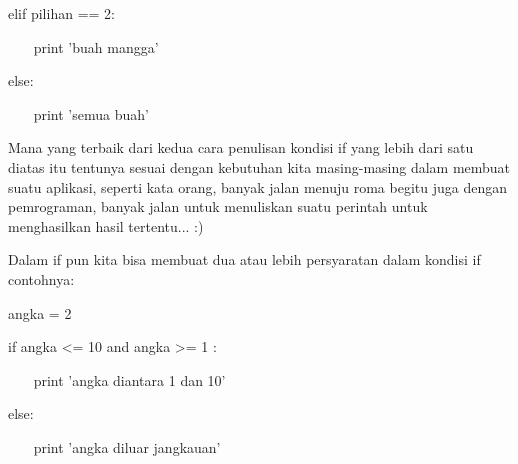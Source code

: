 \noindent 
elif pilihan == 2: \par
\vspace{12pt}
\noindent 
~~~ print 'buah mangga' \par
\vspace{12pt}
\noindent 
else: \par
\vspace{12pt}
\noindent 
~~~ print 'semua buah' \par
\vspace{12pt}
\noindent 
Mana yang terbaik dari kedua cara penulisan kondisi if yang lebih dari satu diatas itu tentunya sesuai dengan kebutuhan kita masing-masing dalam membuat suatu aplikasi, seperti kata orang, banyak jalan menuju roma begitu juga dengan pemrograman, banyak jalan untuk menuliskan suatu perintah untuk menghasilkan hasil tertentu... :) \par
\vspace{12pt}
\noindent 
Dalam if pun kita bisa membuat dua atau lebih persyaratan dalam kondisi $  $if $  $contohnya: \par
\vspace{12pt}
\noindent 
angka = 2 \par
\vspace{12pt}
\noindent 
if angka <= 10 and angka >= 1 : \par
\vspace{12pt}
\noindent 
~~~ print 'angka diantara 1 dan 10' \par
\vspace{12pt}
\noindent 
else: \par
\vspace{12pt}
\noindent 
~~~ print 'angka diluar jangkauan' \par
\vspace{12pt}
\vspace{12pt}

